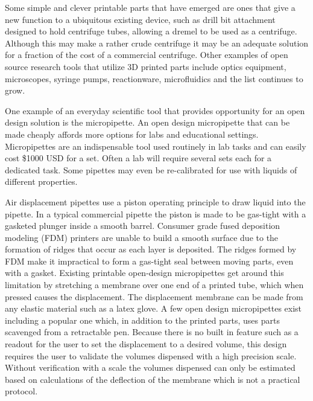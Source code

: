 \documentclass[10pt,letterpaper]{article}
\begin{document}
Some simple and clever printable parts that have emerged are ones that give a new function to a ubiquitous existing device, such as drill bit attachment designed to hold centrifuge tubes, allowing a dremel to be used as a centrifuge\cite{Garvey2009}.
Although this may make a rather crude centrifuge it may be an adequate solution for a fraction of the cost of a commercial centrifuge.
Other examples of open source research tools that utilize 3D printed parts include optics equipment\cite{Zhang2013}, microscopes\cite{Baden2014a,Walus2014}, syringe pumps\cite{Wijnen2014,Patrick2015}, reactionware\cite{Symes2012,Kitson2012,Mathieson2013,Kitson2014}, microfluidics\cite{Brennan2015,Dragone2013} and the list continues to grow\cite{PlosCollections}.

One example of an everyday scientific tool that provides opportunity for an open design solution is the micropipette.
An open design micropipette that can be made cheaply affords more options for labs and educational settings.
Micropipettes are an indispensable tool used routinely in lab tasks and can easily cost \$1000 USD for a set.
Often a lab will require several sets each for a dedicated task.
Some pipettes may even be re-calibrated for use with liquids of different properties.

Air displacement pipettes use a piston operating principle to draw liquid into the pipette\cite{ISO8655}.
In a typical commercial pipette the piston is made to be gas-tight with a gasketed plunger inside a smooth barrel.
Consumer grade fused deposition modeling (FDM) printers are unable to build a smooth surface due to the formation of ridges that occur as each layer is deposited\cite{Takagishi2017}.
The ridges formed by FDM make it impractical to form a gas-tight seal between moving parts, even with a gasket.
Existing printable open-design micropipettes get around this limitation by stretching a membrane over one end of a printed tube, which when pressed causes the displacement.
The displacement membrane can be made from any elastic material such as a latex glove.
A few open design micropipettes exist including a popular one which, in addition to the printed parts, uses parts scavenged from a retractable pen\cite{Baden2014}.
Because there is no built in feature such as a readout for the user to set the displacement to a desired volume, this design requires the user to validate the volumes dispensed with a high precision scale.
Without verification with a scale the volumes dispensed can only be estimated based on calculations of the deflection of the membrane which is not a practical protocol.
\end{document}
